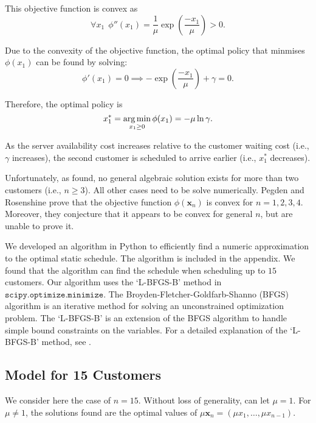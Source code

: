 This objective function is convex as
\begin{equation}
	\forall x_{1} \ \ \phi'' (x_{1}) = \frac{1}{\mu} \exp \left( \frac{- x_{1}}{\mu} \right) > 0.
\end{equation}

Due to the convexity of the objective function, the optimal policy that minmises $\phi (x_{1})$ can be found by solving:
\begin{equation}
	\phi' (x_{1}) = 0 \implies - \exp \left( \frac{- x_{1}}{\mu} \right) + \gamma = 0.
\end{equation}

Therefore, the optimal policy is
\begin{equation}
	x_{1}^{*} = \operatorname*{arg\,min}_{x_{1} \geq 0} \phi (x_{1}) = - \mu \ln \gamma.
\end{equation}

As the server availability cost increases relative to the customer waiting cost (i.e., $\gamma$ increases), the second customer is scheduled to arrive earlier (i.e., $x_{1}^{*}$ decreases).

Unfortunately, as \citet{Pegden} found, no general algebraic solution exists for more than two customers (i.e., $n \geq 3$). All other cases need to be solve numerically. Pegden and Rosenshine prove that the objective function $\phi (\mathbf{x}_{n})$ is convex for $n = 1, 2, 3, 4$. Moreover, they conjecture that it appears to be convex for general $n$, but are unable to prove it.

We developed an algorithm in Python to efficiently find a numeric approximation to the optimal static schedule. The algorithm is included in the appendix. We found that the algorithm can find the schedule when scheduling up to $15$ customers. Our algorithm uses the `L-BFGS-B' method in $\texttt{scipy.optimize.minimize}$. The Broyden-Fletcher-Goldfarb-Shanno (BFGS) algorithm is an iterative method for solving an unconstrained optimization problem. The `L-BFGS-B' is an extension of the BFGS algorithm to handle simple bound constraints on the variables. For a detailed explanation of the `L-BFGS-B' method, see \citet{Byrd}.

\subsection{Model for 15 Customers}
We consider here the case of $n = 15$. Without loss of generality, can let $\mu = 1$. For $\mu \neq 1$, the solutions found are the optimal values of $\mu \mathbf{x}_{n} = (\mu x_{1}, \ldots, \mu x_{n - 1})$.

